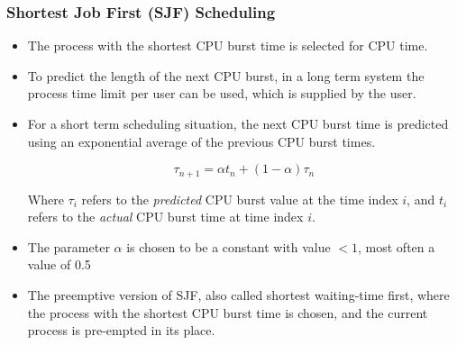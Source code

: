 \documentclass{article}
\theoremstyle{plain}
\theoremstyle{definition}
\begin{document}
\subsubsection{Shortest Job First (SJF) Scheduling}
\begin{itemize}
    \item The process with the shortest CPU burst time is selected for CPU time. 
    
    \item To predict the length of the next CPU burst, in a long term system the process time limit per user can be used, which is supplied by the user. 
    
    \item For a short term scheduling situation, the next CPU burst time is predicted using an exponential average of the previous CPU burst times.
    
    \begin{equation}
        \tau_{n+1} = \alpha t_n + (1-\alpha) \tau_{n}
    \end{equation}
    
    Where $\tau_{i}$ refers to the \textit{predicted} CPU burst value at the time index $i$, and $t_i$ refers to the \textit{actual} CPU burst time at time index $i$.
    
    \item The parameter $\alpha$ is chosen to be a constant with value $< 1$, most often a value of 0.5
    
    \item The preemptive version of SJF, also called shortest waiting-time first, where the process with the shortest CPU burst time is chosen, and the current process is pre-empted in its place. 
\end{itemize}
\end{document}

